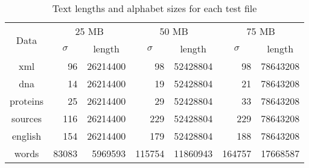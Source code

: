 \begin{center}
\begin{table}[h]
\begin{tabular}{crrrrrr}
\toprule
\multirow{2}{*}{Data} & \multicolumn{2}{c}{25 MB} & \multicolumn{2}{c}{50 MB} &  
	\multicolumn{2}{c}{75 MB}\\
		  \cmidrule(r){2-7}
	      &\multicolumn{1}{c}{$\sigma$}& \multicolumn{1}{c}{length}
		  &\multicolumn{1}{c}{$\sigma$}&\multicolumn{1}{c}{length}
		  &\multicolumn{1}{c}{$\sigma$}&\multicolumn{1}{c}{length}\\
\midrule
xml 	  & 96	   & 26214400 & 98 	   & 52428804 & 98 	   & 78643208 \\
dna 	  & 14     & 26214400 & 19 	   & 52428804 & 21     & 78643208 \\
proteins  & 25     & 26214400 & 29     & 52428804 & 33     & 78643208 \\
sources   & 116    & 26214400 & 229    & 52428804 & 229    & 78643208 \\
english   & 154    & 26214400 & 179    & 52428804 & 188    & 78643208 \\
words     & 83083  & 5969593  & 115754 & 11860943 & 164757 & 17668587 \\
\bottomrule
\end{tabular}
\caption{Text lengths and alphabet sizes for each test file}
\label{tab:files}
\end{table}
\end{center}
